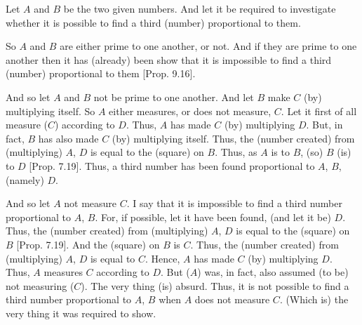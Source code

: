 \begin{Parallel}{}{}
{Let $A$ and $B$ be the two given numbers. And let it be required to investigate whether it is possible to find a third (number) proportional
to them.

So $A$ and $B$ are either prime to one another, or not. 
And if they are prime to one another then it has (already) been show that it is impossible
to find a third (number) proportional to them [Prop. 9.16].

And so let $A$ and $B$ not be prime to one another. And let $B$ make $C$
(by) multiplying itself. So $A$ either measures, or does not measure, $C$. 
Let it first of all measure ($C$) according to $D$. Thus, $A$ has made
$C$ (by) multiplying $D$. But, in fact, $B$ has also made
$C$ (by) multiplying itself. Thus, the (number created) from (multiplying)
$A$, $D$ is equal to the (square) on $B$. Thus, as $A$ is to $B$, (so)
$B$ (is) to $D$ [Prop. 7.19]. Thus, a third number
has been found proportional to $A$, $B$, (namely) $D$. 

And so let $A$ not measure $C$. I say that it is impossible to find a third
number proportional to $A$, $B$. For, if possible, let it have been found,
(and let it be) $D$. Thus, the (number created) from (multiplying) $A$, $D$
is equal to the (square) on $B$ [Prop. 7.19]. 
And the (square) on $B$ is $C$. Thus, the (number created) from (multiplying) $A$, $D$
is equal to $C$. Hence, $A$ has made $C$ (by) multiplying $D$. 
Thus, $A$ measures $C$ according to $D$. But ($A$) was, in fact, also assumed
(to be) not measuring ($C$). The very thing (is) absurd. Thus, it is not
possible to find a third number proportional to $A$, $B$ when $A$ does not
measure $C$. (Which is) the very thing it was required to show.}
\end{Parallel}

